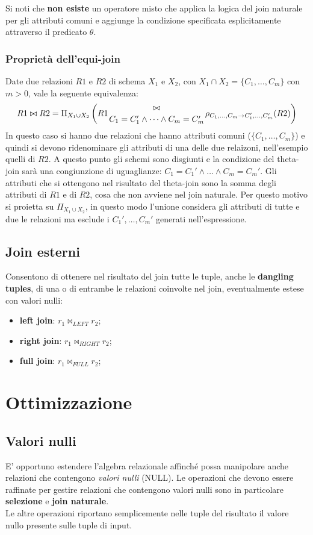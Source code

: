 \documentclass{report}
\begin{document}
Si noti che \textbf{non esiste} un operatore misto che applica la logica del join naturale per gli attributi comuni e aggiunge la condizione specificata esplicitamente attraverso il predicato $\theta$.

\subsubsection{Propriet\`a dell'equi-join}

Date due relazioni $R1$ e $R2$ di schema $X_1$ e $X_2$, con $X_1 \cap X_2 = \{ C_1, \dots, C_m\}$ con $m > 0$, vale la seguente equivalenza:
\[ R1 \bowtie R2 = \Pi_{X_1 \cup X_2} \left(R1 {\bowtie \atop C_1=C_1' \wedge \dots \wedge C_m=C_m'} \rho_{C_1,\dots,C_m \to C_1', \dots, C_m'}(R2)\right) \]
In questo caso si hanno due relazioni che hanno attributi comuni ($\{ C_1, \dots, C_m\}$) e quindi si devono ridenominare gli attributi di una delle due relaizoni, nell'esempio quelli di $R2$. A questo punto gli schemi sono disgiunti e la condizione del theta-join sar\`a una congiunzione di uguaglianze: $C_1=C_1' \wedge \dots \wedge C_m=C_m'$. Gli attributi che si ottengono nel risultato del theta-join sono la somma degli attributi di $R1$ e di $R2$, cosa che non avviene nel join naturale. Per questo motivo si proietta su $\Pi_{X_1\cup X_2}$, in questo modo l'unione considera gli attributi di tutte e due le relazioni ma esclude i $C_1', \dots, C_m'$ generati nell'espressione.

\subsection{Join esterni}
Consentono di ottenere nel risultato del join tutte le tuple, anche le \textbf{dangling tuples}, di una o di entrambe le relazioni coinvolte nel join, eventualmente estese con valori nulli:
\begin{itemize}
	\item \textbf{left join}: $r_1 \bowtie_{LEFT} r_2$;
	\item \textbf{right join}: $r_1 \bowtie_{RIGHT} r_2$;
	\item \textbf{full join}: $r_1 \bowtie_{FULL} r_2$;
\end{itemize}


\section{Ottimizzazione}
\subsection{Valori nulli}
E’ opportuno estendere l’algebra relazionale affinché possa manipolare anche relazioni che contengono \emph{valori nulli} (NULL). Le operazioni che devono essere raffinate per gestire relazioni che contengono valori nulli sono in particolare \textbf{selezione} e \textbf{join naturale}.\\
Le altre operazioni riportano semplicemente nelle tuple del risultato il valore nullo presente sulle tuple di input.
\end{document}

